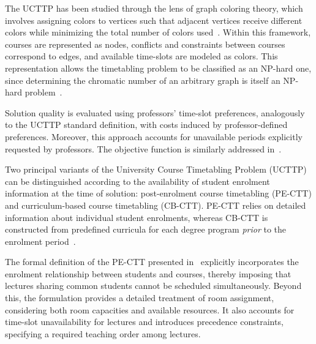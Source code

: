     The UCTTP has been studied through the lens of graph coloring theory, which involves assigning colors to vertices such that adjacent vertices receive different colors while minimizing the total number of colors used~\cite{dewerra1985introduction,burke}. Within this framework, courses are represented as nodes, conflicts and constraints between courses correspond to edges, and available time-slots are modeled as colors. This representation allows the timetabling problem to be classified as an NP-hard one, since determining the chromatic number of an arbitrary graph is itself an NP-hard problem~\cite{babaei2015survey}.

    Solution quality is evaluated using professors’ time-slot preferences, analogously to the UCTTP standard definition, with costs induced by professor-defined preferences. Moreover, this approach accounts for unavailable periods explicitly requested by professors. The objective function is similarly addressed in~\cite{chen}.
    
    
    Two principal variants of the University Course Timetabling Problem (UCTTP) can be distinguished according to the availability of student enrolment information at the time of solution: post-enrolment course timetabling (PE-CTT) and curriculum-based course timetabling (CB-CTT). %
    PE-CTT relies on detailed information about individual student enrolments, whereas CB-CTT is constructed from predefined curricula for each degree program \emph{prior} to the enrolment period~\cite{ceschia2012design}.

    The formal definition of the PE-CTT presented in~\cite{ceschia2012design} explicitly incorporates the enrolment relationship between students and courses, thereby imposing that lectures sharing common students cannot be scheduled simultaneously. Beyond this, the formulation provides a detailed treatment of room assignment, considering both room capacities and available resources. It also accounts for time-slot unavailability for lectures and introduces precedence constraints, specifying a required teaching order among lectures.
    

